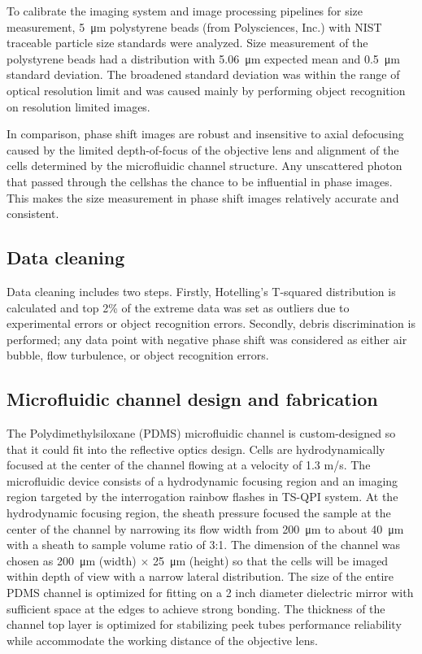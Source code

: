 \documentclass[aps,pra,reprint,superscriptaddress]{revtex4-1}
\begin{document}
To calibrate the imaging system and image processing pipelines for size measurement, \SI{5}{\micro\meter} polystyrene beads (from Polysciences, Inc.) with NIST traceable particle size standards were analyzed. Size measurement of the polystyrene beads had a distribution with \SI{5.06}{\micro\meter} expected mean and \SI{0.5}{\micro\meter} standard deviation. The broadened standard deviation was within the range of optical resolution limit and was caused mainly by performing object recognition on resolution limited images.

In comparison, phase shift images are robust and insensitive to axial defocusing \cite{spadinger1990effect} caused by the limited depth-of-focus of the objective lens and alignment of the cells determined by the microfluidic channel structure. Any unscattered photon that passed through the cellshas the chance to be influential in phase images. This makes the size measurement in phase shift images relatively accurate and consistent. 

\subsection{Data cleaning}

Data cleaning includes two steps. Firstly, Hotelling's T-squared distribution is calculated and top 2\% of the extreme data was set as outliers due to experimental errors or object recognition errors. Secondly, debris discrimination is performed; any data point with negative phase shift was considered as either air bubble, flow turbulence, or object recognition errors.

\subsection{Microfluidic channel design and fabrication}

The Polydimethylsiloxane (PDMS) microfluidic channel is custom-designed so that it could fit into the reflective optics design. Cells are hydrodynamically focused \cite{knight1998hydrodynamic,lee2006hydrodynamic} at the center of the channel flowing at a velocity of 1.3 m/s. The microfluidic device consists of a hydrodynamic focusing region and an imaging region targeted by the interrogation rainbow flashes in TS-QPI system. At the hydrodynamic focusing region, the sheath pressure focused the sample at the center of the channel by narrowing its flow width from \SI{200}{\micro\meter} to about \SI{40}{\micro\meter} with a sheath to sample volume ratio of 3:1. The dimension of the channel was chosen as \SI{200}{\micro\meter} (width) $\times$ \SI{25}{\micro\meter} (height) so that the cells will be imaged within depth of view with a narrow lateral distribution. The size of the entire PDMS channel is optimized for fitting on a 2 inch diameter dielectric mirror with sufficient space at the edges to achieve strong bonding. The thickness of the channel top layer is optimized for stabilizing peek tubes performance reliability while accommodate the working distance of the objective lens. 
\end{document}
